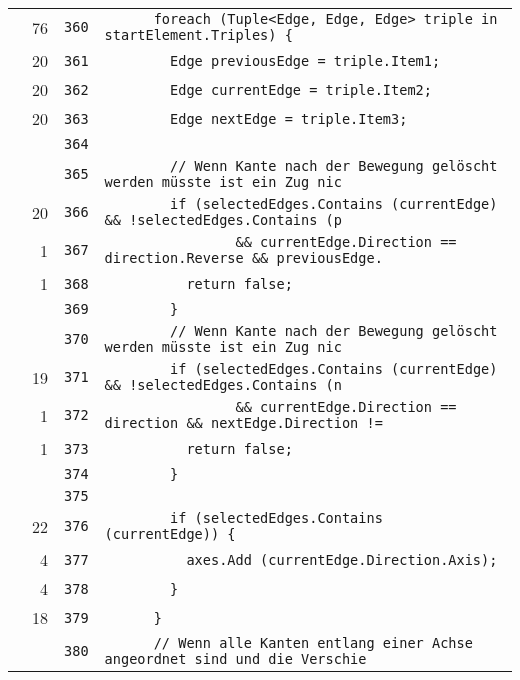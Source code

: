 \documentclass[a4paper,10pt]{article}
\begin{document}
\begin{longtable}[l]{lrrl}
\cellcolor{green} & 76 & \verb~360~ & \verb~      foreach (Tuple<Edge, Edge, Edge> triple in startElement.Triples) {~\\
\cellcolor{green} & 20 & \verb~361~ & \verb~        Edge previousEdge = triple.Item1;~\\
\cellcolor{green} & 20 & \verb~362~ & \verb~        Edge currentEdge = triple.Item2;~\\
\cellcolor{green} & 20 & \verb~363~ & \verb~        Edge nextEdge = triple.Item3;~\\
\cellcolor{gray} &  & \verb~364~ & \verb~~\\
\cellcolor{gray} &  & \verb~365~ & \verb~        // Wenn Kante nach der Bewegung gelöscht werden müsste ist ein Zug nic~\\
\cellcolor{green} & 20 & \verb~366~ & \verb~        if (selectedEdges.Contains (currentEdge) && !selectedEdges.Contains (p~\\
\cellcolor{green} & 1 & \verb~367~ & \verb~                && currentEdge.Direction == direction.Reverse && previousEdge.~\\
\cellcolor{green} & 1 & \verb~368~ & \verb~          return false;~\\
\cellcolor{gray} &  & \verb~369~ & \verb~        }~\\
\cellcolor{gray} &  & \verb~370~ & \verb~        // Wenn Kante nach der Bewegung gelöscht werden müsste ist ein Zug nic~\\
\cellcolor{green} & 19 & \verb~371~ & \verb~        if (selectedEdges.Contains (currentEdge) && !selectedEdges.Contains (n~\\
\cellcolor{green} & 1 & \verb~372~ & \verb~                && currentEdge.Direction == direction && nextEdge.Direction !=~\\
\cellcolor{green} & 1 & \verb~373~ & \verb~          return false;~\\
\cellcolor{gray} &  & \verb~374~ & \verb~        }~\\
\cellcolor{gray} &  & \verb~375~ & \verb~~\\
\cellcolor{green} & 22 & \verb~376~ & \verb~        if (selectedEdges.Contains (currentEdge)) {~\\
\cellcolor{green} & 4 & \verb~377~ & \verb~          axes.Add (currentEdge.Direction.Axis);~\\
\cellcolor{green} & 4 & \verb~378~ & \verb~        }~\\
\cellcolor{green} & 18 & \verb~379~ & \verb~      }~\\
\cellcolor{gray} &  & \verb~380~ & \verb~      // Wenn alle Kanten entlang einer Achse angeordnet sind und die Verschie~\\

\end{longtable}
\end{document}

